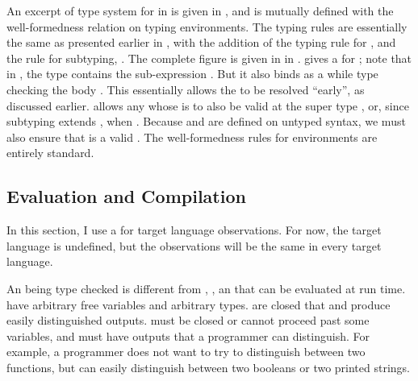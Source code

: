 \FigECCTypingShort
An excerpt of type system for \slang in is given in
, and is mutually defined with the
well-formedness relation on typing environments.
The typing rules are essentially the same as presented earlier in
, with the addition of the typing rule for
, and the rule for subtyping, .
The complete figure is given in  in
.
 gives a  for 
; note that in \im{\slete{\sx}{\se}{\sepr}}, the
type \im{\subst{\sB}{\se}{\sx}} contains the sub-expression \im{\se}.
But it also binds \im{\sx = \se} as a  while type checking the
body \im{\sepr}.
This essentially allows the  \im{\subst{\sB}{\se}{\sx}} to be
resolved ``early'', as discussed earlier.
 allows any  \im{\se} whose  is
\im{\sA} to also be valid at the super type \im{\sB}, or, since subtyping
extends , when \im{\sA \equiv \sB}.
Because  and  are defined on untyped syntax,
we must also ensure that \im{\sB} is a valid .
The well-formedness rules for environments are entirely standard.

\subsection{Evaluation and Compilation}
\begin{typographical}
  In this section, I use a \emph{} for target language
  observations.
  For now, the target language is undefined, but the observations will be the
  same in every target language.
\end{typographical}
An  being type checked is different from \emph{},
\ie, an  that can be evaluated at run time.
 have arbitrary free variables and arbitrary types.
 are closed
 that  and produce easily distinguished
outputs.
 must be closed or  cannot proceed past some
variables, and must have outputs that a programmer can distinguish.
For example, a programmer does not want to try to distinguish between two
functions, but can easily distinguish between two booleans or two printed
strings.


